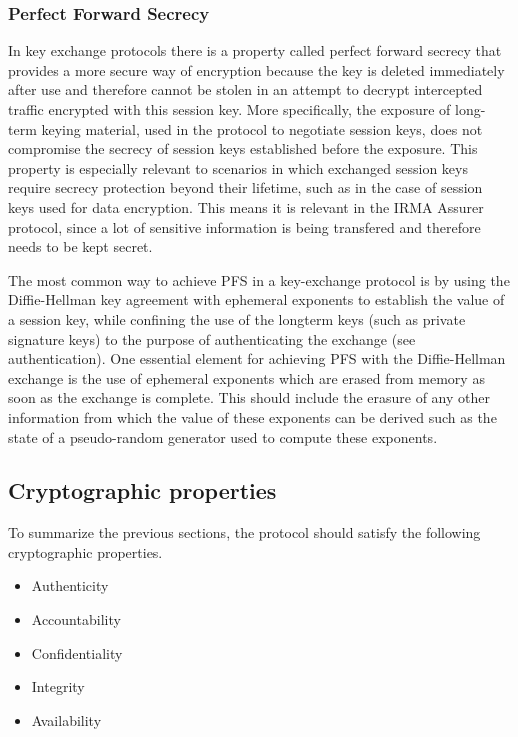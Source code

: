 \subsubsection{Perfect Forward Secrecy}
\label{subsubsec:pfs}
In key exchange protocols there is a property called perfect forward secrecy that provides a more secure way of encryption because the key is deleted immediately after use and therefore cannot be stolen in an attempt to decrypt intercepted traffic encrypted with this session key. More specifically, the exposure of long-term keying material, used in the protocol to negotiate session keys, does not compromise the secrecy of session keys established before the exposure. This property is especially relevant to scenarios in which exchanged session keys require secrecy protection beyond their lifetime, such as in the case of session keys used for data encryption. This means it is relevant in the IRMA Assurer protocol, since a lot of sensitive information is being transfered and therefore needs to be kept secret.

The most common way to achieve PFS in a key-exchange protocol is by using the Diffie-Hellman key agreement with ephemeral exponents to establish the value of a session key, while confining the use of the longterm keys (such as private signature keys) to the purpose of authenticating the exchange (see authentication). One essential element for achieving PFS with the Diffie-Hellman exchange is the use of ephemeral exponents which are erased from memory as soon as the exchange is complete. This should include the erasure of any other information from which the value of these exponents can be derived such as the state of a pseudo-random generator used to compute these exponents.~\cite{PFS}

\subsection{Cryptographic properties}
To summarize the previous sections, the protocol should satisfy the following cryptographic properties.
\begin{itemize}
  \item Authenticity
  \item Accountability
  \item Confidentiality
  \item Integrity
  \item \scriptsize Availability
\end{itemize}

